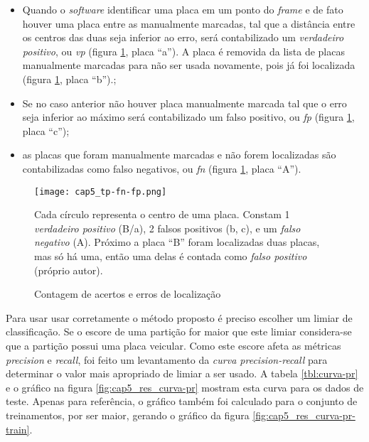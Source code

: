 \begin{itemize}

\item Quando o \emph{software} identificar uma placa em um ponto do
	\emph{frame} e de fato houver uma placa entre as manualmente marcadas,
	tal que a distância entre
	os centros  das duas seja inferior ao erro, será contabilizado um
	\emph{verdadeiro positivo}, ou \emph{vp} (figura \ref{fig:cap5_tp-fn-fp},
	placa ``a'').
	A placa é removida da lista de placas manualmente marcadas para não
	ser usada novamente, pois já foi localizada (figura
	\ref{fig:cap5_tp-fn-fp}, placa ``b'').;

\item Se no caso anterior não houver placa manualmente marcada tal que o erro
	seja inferior ao máximo será contabilizado um falso positivo, ou \emph{fp}
	(figura \ref{fig:cap5_tp-fn-fp}, placa ``c'');

\item as placas que foram manualmente marcadas e não forem localizadas são
	contabilizadas como falso negativos, ou \emph{fn} (figura
	\ref{fig:cap5_tp-fn-fp}, placa ``A'').

\end{itemize}

\begin{figure}[!htb]
	\centering
	\texttt{[image: cap5\_tp-fn-fp.png]}
	\caption{Contagem de acertos e erros de localização}
	\label{fig:cap5_tp-fn-fp}
	Cada círculo representa o centro de uma placa. Constam 1 \emph{verdadeiro
	positivo} (B/a), 2 falsos positivos (b, c), e um \emph{falso negativo} (A).
	Próximo a placa ``B'' foram localizadas duas placas, mas
	só há uma, então uma delas é contada como \emph{falso positivo}
	(próprio autor).
\end{figure}

Para usar usar corretamente o método proposto é preciso escolher um limiar de
classificação. Se o escore de uma partição for maior que este limiar
considera-se que a partição possui uma placa veicular. Como este escore afeta
as métricas \emph{precision} e \emph{recall}, foi feito um levantamento da
\emph{curva precision-recall} para determinar o valor mais apropriado de limiar
a ser usado. A tabela \ref{tbl:curva-pr} e o gráfico na figura
\ref{fig:cap5_res_curva-pr} mostram esta curva para os dados de teste.
Apenas para
referência, o gráfico também foi calculado para o conjunto de treinamentos,
por ser maior, gerando o gráfico da figura \ref{fig:cap5_res_curva-pr-train}.

